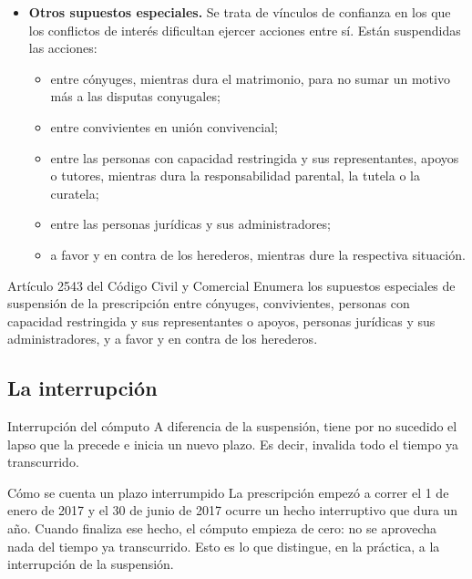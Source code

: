 \documentclass[12pt,oneside]{book}
\begin{document}
\begin{itemize}
    \item \textbf{Otros supuestos especiales.} Se trata de vínculos de confianza en los que los conflictos de interés dificultan ejercer acciones entre sí. Están suspendidas las acciones:
    \begin{itemize}
        \item entre cónyuges, mientras dura el matrimonio, para no sumar un motivo más a las disputas conyugales;
        \item entre convivientes en unión convivencial;
        \item entre las personas con capacidad restringida y sus representantes, apoyos o tutores, mientras dura la responsabilidad parental, la tutela o la curatela;
        \item entre las personas jurídicas y sus administradores;
        \item a favor y en contra de los herederos, mientras dure la respectiva situación.
    \end{itemize}
\end{itemize}

\begin{articulo}{Artículo 2543 del Código Civil y Comercial}
Enumera los supuestos especiales de suspensión de la prescripción entre cónyuges, convivientes, personas con capacidad restringida y sus representantes o apoyos, personas jurídicas y sus administradores, y a favor y en contra de los herederos.
\end{articulo}

\subsection{La interrupción}

\begin{definition}{Interrupción del cómputo}
A diferencia de la suspensión, tiene por no sucedido el lapso que la precede e inicia un nuevo plazo. Es decir, invalida todo el tiempo ya transcurrido.
\end{definition}

\begin{example}{Cómo se cuenta un plazo interrumpido}
La prescripción empezó a correr el 1 de enero de 2017 y el 30 de junio de 2017 ocurre un hecho interruptivo que dura un año. Cuando finaliza ese hecho, el cómputo empieza de cero: no se aprovecha nada del tiempo ya transcurrido. Esto es lo que distingue, en la práctica, a la interrupción de la suspensión.
\end{example}
\end{document}
